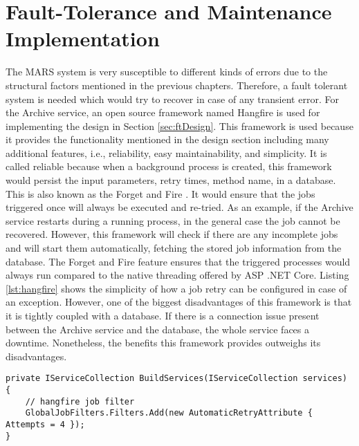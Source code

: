 \newpage
\section{Fault-Tolerance and Maintenance Implementation}
The MARS system is very susceptible to different kinds of errors due to the structural factors mentioned in the previous chapters. Therefore, a fault tolerant
system is needed which would try to recover in case of any transient error. For the Archive service, an open source framework
named Hangfire is used for implementing the design in Section \ref{sec:ftDesign}. This framework is used because it provides
the functionality mentioned in the design section including many additional features, i.e., reliability, easy maintainability, and simplicity. It is called
reliable because when a background process is created, this framework would persist the input parameters, retry times, method name, in a database. 
This is also known as the Forget and Fire \cite{Hangfire}. It would
ensure that the jobs triggered once will always be executed and re-tried. As an example, if the
Archive service restarts during a running process, in the general case the job cannot be recovered. However, this framework will check if 
there are any incomplete jobs and will start them automatically, fetching the stored job information from the database. The Forget and Fire 
feature ensures that the triggered processes would always run compared to the native threading offered by ASP .NET Core.
Listing \ref{lst:hangfire}
shows the simplicity of how a job retry can be configured in case of an exception. However, one of the biggest disadvantages of this framework is that it is 
tightly coupled
with a database. If there is a connection issue present between the Archive service and the database, the whole service faces a downtime. Nonetheless, the 
benefits this framework provides outweighs its disadvantages.

\begin{lstlisting}[language={[Sharp]C}, caption={Hangfire retry attempt configuration}, captionpos=b,label={lst:hangfire}]
private IServiceCollection BuildServices(IServiceCollection services)
{
    // hangfire job filter
    GlobalJobFilters.Filters.Add(new AutomaticRetryAttribute { Attempts = 4 });
}
\end{lstlisting}


